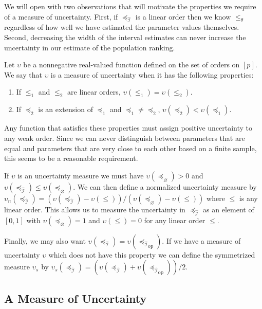 \documentclass[12pt]{article}
\newcommand{\dual}[1]{#1_{\operatorname{op}}}
\newcommand{\eord}{{\preceq_{\varnothing}}}
\newcommand{\iord}{{\preceq_{\hat{\mathcal{I}}}}}
\newcommand{\pord}{{\leqslant_{\theta}}}
\numberwithin{theorem}{section}
\begin{document}
We will open with two observations that will motivate the properties we require of a measure of uncertainty.  First, if $\iord$ is a linear order then we know $\pord$ regardless of how well we have estimated the parameter values themselves.  Second, decreasing the width of the interval estimates can never increase the uncertainty in our estimate of the population ranking.

Let $\upsilon$ be a nonnegative real-valued function defined on the set of orders on $[p]$.  We say that $\upsilon$ is a measure of uncertainty when it has the following properties:

\begin{enumerate}

\item\label{cond_uncert_lin} If $\leqslant_1$ and $\leqslant_2$ are linear orders, $\upsilon(\leqslant_1) = \upsilon(\leqslant_2)$.

\item\label{cond_uncert_ext} If $\preceq_2$ is an extension of $\preceq_1$ and $\preceq_1 \neq \preceq_2$, $\upsilon(\preceq_2) < \upsilon(\preceq_1)$.

\end{enumerate}

\noindent
Any function that satisfies these properties must assign positive uncertainty to any weak order.  Since we can never distinguish between parameters that are equal and parameters that are very close to each other based on a finite sample, this seems to be a reasonable requirement.

If $\upsilon$ is an uncertainty measure we must have $\upsilon(\eord) > 0$ and $\upsilon(\iord) \leq \upsilon(\eord)$.  We can then define a normalized uncertainty measure by $\upsilon_n(\iord) = (\upsilon(\iord) - \upsilon(\leqslant)) / (\upsilon(\eord) - \upsilon(\leqslant))$ where $\leqslant$ is any linear order.  This allows us to measure the uncertainty in $\iord$ as an element of $[0, 1]$ with $\upsilon(\eord) = 1$ and $\upsilon(\leqslant) = 0$ for any linear order $\leqslant$.

Finally, we may also want $\upsilon(\iord) = \upsilon(\dual{\iord})$.  If we have a measure of uncertainty $\upsilon$ which does not have this property we can define the symmetrized measure $\upsilon_s$ by $\upsilon_s(\iord) = (\upsilon(\iord) + \upsilon(\dual{\iord}))/2$.

\subsection{A Measure of Uncertainty}
\label{subsec_measure_uncert_cand}
\end{document}
